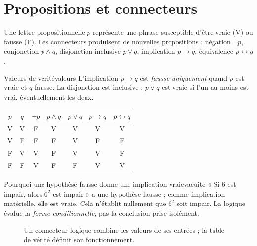 \section{Propositions et connecteurs}
Une lettre propositionnelle $p$ représente une phrase susceptible d'être vraie (V) ou fausse (F). Les connecteurs produisent de nouvelles propositions : négation $\neg p$, conjonction $p\wedge q$, disjonction inclusive $p\vee q$, implication $p\to q$, équivalence $p\leftrightarrow q$.
\begin{definition}{Valeurs de vérité}{valeurs}
L'implication $p\to q$ est \emph{fausse uniquement} quand $p$ est vraie et $q$ fausse. La disjonction est inclusive : $p\vee q$ est vraie si l'un au moins est vrai, éventuellement les deux.
\end{definition}
\begin{center}\renewcommand{\arraystretch}{1.23}
\begin{tabular}{cc|ccccc}\toprule
$p$&$q$&$\neg p$&$p\wedge q$&$p\vee q$&$p\to q$&$p\leftrightarrow q$\\\midrule
V&V&F&V&V&V&V\\
V&F&F&F&V&F&F\\
F&V&V&F&V&V&F\\
F&F&V&F&F&V&V\\\bottomrule
\end{tabular}\end{center}
\begin{exemple}{Pourquoi une hypothèse fausse donne une implication vraie}{vacuite}
« Si $6$ est impair, alors $6^2$ est impair » a une hypothèse fausse ; comme implication matérielle, elle est vraie. Cela n'établit nullement que $6^2$ soit impair. La logique évalue la \emph{forme conditionnelle}, pas la conclusion prise isolément.
\end{exemple}
\begin{figure}[htbp]\centering
{}
\caption{Un connecteur logique combine les valeurs de ses entrées ; la table de vérité définit son fonctionnement.}
\end{figure}


